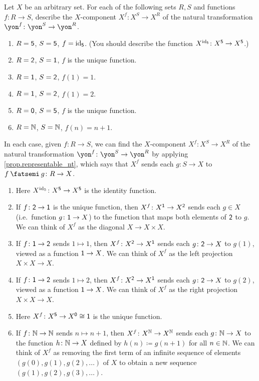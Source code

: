 \documentclass[Book-Poly]{subfiles}
\begin{document}
\begin{exercise} \label{exc.representable_nt_components}
    Let $X$ be an arbitrary set. For each of the following sets $R,S$ and functions $f\colon R\to S$, describe the $X$-component $X^f\colon X^S\to X^R$ of the natural transformation $\yon^f\colon\yon^S\to\yon^R$.
    \begin{enumerate}
        \item \label{exc.representable_nt_components.id} $R=\textsf{5}$, $S=\textsf{5}$, $f=\mathrm{id}_{\textsf{5}}$. (You should describe the function $X^{\mathrm{id}_{\textsf{5}}}\colon X^{\textsf{5}}\to X^{\textsf{5}}$.)
        \item $R=\textsf{2}$, $S=\textsf{1}$, $f$ is the unique function.
        \item $R=\textsf{1}$, $S=\textsf{2}$, $f(1)=1$.
        \item $R=\textsf{1}$, $S=\textsf{2}$, $f(1)=2$.
        \item $R=\textsf{0}$, $S=\textsf{5}$, $f$ is the unique function.
        \item $R=\mathbb{N}$, $S=\mathbb{N}$, $f(n)=n+1$.
        \qedhere
    \end{enumerate}

    \begin{solution}
        In each case, given $f \colon R \to S$, we can find the $X$-component $X^f \colon X^S \to X^R$ of the natural transformation $\yon^f\colon\yon^S\to\yon^R$ by applying \cref{prop.representable_nt}, which says that $X^f$ sends each $g \colon S \to X$ to $f \then g \colon R \to X$.
        \begin{enumerate}
            \item Here $X^{\mathrm{id}_5}\colon X^{\textsf{5}}\to X^{\textsf{5}}$ is the identity function.
            \item If $f\colon\textsf{2}\to\textsf{1}$ is the unique function, then $X^f\colon X^{\textsf{1}}\to X^{\textsf{2}}$ sends each $g \in X$ (i.e.\ function $g \colon \textsf{1} \to X$) to the function that maps both elements of $\textsf{2}$ to $g$.
            We can think of $X^f$ as the diagonal $X \to X \times X$.
            \item If $f\colon\textsf{1}\to\textsf{2}$ sends $1\mapsto1$, then $X^f\colon X^{\textsf{2}}\to X^{\textsf{1}}$ sends each $g \colon \textsf{2} \to X$ to $g(1)$, viewed as a function $\textsf{1} \to X$.
            We can think of $X^f$ as the left projection $X \times X \to X$.
            \item If $f\colon\textsf{1}\to\textsf{2}$ sends $1\mapsto2$, then $X^f\colon X^{\textsf{2}}\to X^{\textsf{1}}$ sends each $g \colon \textsf{2} \to X$ to $g(2)$, viewed as a function $\textsf{1} \to X$.
            We can think of $X^f$ as the right projection $X \times X \to X$.
            \item Here $X^f\colon X^{\textsf{5}}\to X^{\textsf{0}}\cong\textsf{1}$ is the unique function.
            \item If $f\colon\mathbb{N}\to\mathbb{N}$ sends $n\mapsto n+1$, then $X^f\colon X^{\mathbb{N}}\to X^{\mathbb{N}}$ sends each $g \colon \mathbb{N} \to X$ to the function $h \colon \mathbb{N} \to X$ defined by $h(n)\coloneqq g(n+1)$ for all $n \in \mathbb{N}$.
            We can think of $X^f$ as removing the first term of an infinite sequence of elements $(g(0),g(1),g(2),\ldots)$ of $X$ to obtain a new sequence $(g(1),g(2),g(3),\ldots)$.
        \end{enumerate}
    \end{solution}
\end{exercise}
\end{document}
